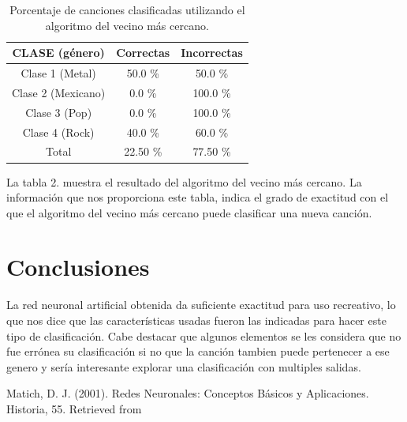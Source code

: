 \documentclass[conference]{IEEEtran}
\begin{document}
\begin{table}[h]
\renewcommand{\arraystretch}{1.3}
\renewcommand{\tablename}{Tabla}
\caption{ Porcentaje de canciones clasificadas utilizando el algoritmo del vecino más cercano. }
\label{table_example}
\centering
\begin{tabular}{|c|c|c|}
\hline
CLASE (género) & Correctas & Incorrectas \\
\hline
Clase 1 (Metal) & 50.0 \% & 50.0 \% \\
\hline
Clase 2 (Mexicano) & 0.0 \% & 100.0 \% \\
\hline
Clase 3 (Pop) & 0.0 \% & 100.0 \% \\
\hline
Clase 4 (Rock) & 40.0 \% & 60.0 \% \\
\hline
Total & 22.50 \% & 77.50 \% \\
\hline
\end{tabular}
\end{table}

La tabla 2. muestra el resultado del algoritmo del vecino más cercano. La información que nos proporciona este tabla, indica el grado de exactitud con el que el algoritmo del vecino más cercano puede clasificar una nueva canción. \\

\section{Conclusiones}
La red neuronal artificial obtenida da suficiente exactitud para uso recreativo, lo que nos dice que las características usadas fueron las indicadas para hacer este tipo de clasificación. Cabe destacar que algunos elementos se les considera que no fue errónea su clasificación si no que la canción tambien puede pertenecer a ese genero y sería interesante explorar una clasificación con multiples salidas. 

\begin{thebibliography}{1}

Matich, D. J. (2001). Redes Neuronales: Conceptos Básicos y Aplicaciones. Historia, 55. Retrieved from %


\end{thebibliography}
\end{document}
